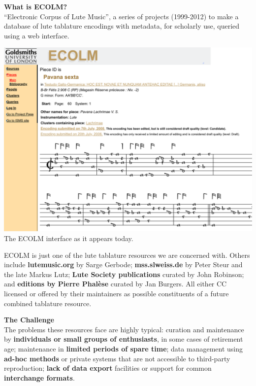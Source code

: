 \documentclass[a0,landscape]{a0poster}
\begin{document}
\begin{multicols}{3}
  
\begin{sloppypar}

  \noindent\textbf{\LARGE What is ECOLM?}\\

  \noindent``Electronic Corpus of Lute Music'', a series of projects
  (1999-2012) to make a database of lute tablature encodings with
  metadata, for scholarly use, queried using a web interface.

  \begin{center}\vspace{1cm}
  \includegraphics[width=0.9\columnwidth,frame]{images/ecolm-screenshot}\\
  {\small The ECOLM interface as it appears today.}
  \end{center}\vspace{1cm}

  \noindent ECOLM is just one of the lute tablature resources we are
  concerned with. Others include {\bf lutemusic.org} by Sarge Gerbode;
  {\bf mss.slweiss.de} by Peter Steur and the late Markus Lutz; {\bf
    Lute Society publications} curated by John Robinson; and {\bf
    editions by Pierre Phal\`ese} curated by Jan Burgers. All either
  CC licensed or offered by their maintainers as possible constituents
  of a future combined tablature resource.

  \vspace{2cm}
  \noindent\textbf{\LARGE The Challenge}\\

  \noindent The problems these resources face are highly typical:
  curation and maintenance by \textbf{individuals or small groups of
    enthusiasts}, in some cases of retirement age; maintenance in
  \textbf{limited periods of spare time}; data management using
  \textbf{ad-hoc methods} or private systems that are not accessible
  to third-party reproduction; \textbf{lack of data export} facilities
  or support for common \textbf{interchange formats}.


\end{sloppypar}
\end{multicols}
\end{document}
